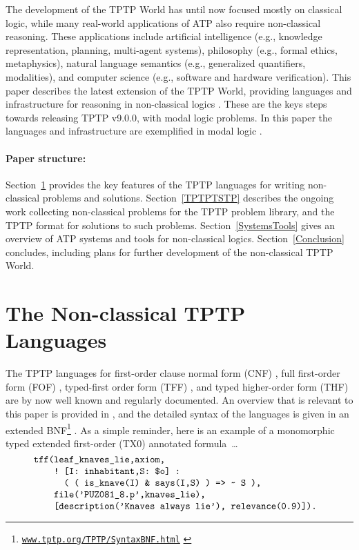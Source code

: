 \documentclass[runningheads]{llncs}
\begin{document}
The development of the TPTP World has until now focused mostly on classical logic, while many 
real-world applications of ATP also require non-classical reasoning. 
These applications include artificial intelligence (e.g., knowledge representation, planning, 
multi-agent systems), philosophy (e.g., formal ethics, metaphysics), natural language semantics 
(e.g., generalized quantifiers, modalities), and computer science (e.g., software and hardware 
verification).
This paper describes the latest extension of the TPTP World, providing languages and
infrastructure for reasoning in non-classical logics \cite{Pri08,Gob01}.
These are the keys steps towards releasing TPTP v9.0.0, with modal logic problems.
In this paper the languages and infrastructure are exemplified in modal logic \cite{BBW06}.

\paragraph{Paper structure:}
Section~\ref{TPTPLanguages} provides the key features of the TPTP languages for writing
non-classical problems and solutions. 
Section~\ref{TPTPTSTP} describes the ongoing work collecting non-classical problems for the TPTP
problem library, and the TPTP format for solutions to such problems.
Section~\ref{SystemsTools} gives an overview of ATP systems and tools for non-classical logics.
Section~\ref{Conclusion} concludes, including plans for further development of the non-classical
TPTP World.

\section{The Non-classical TPTP Languages}
\label{TPTPLanguages}

The TPTP languages for first-order clause normal form (CNF) \cite{SS98-JAR}, full first-order 
form (FOF) \cite{Sut09}, typed-first order form (TFF) \cite{SS+12,BP13-TFF1}, and typed 
higher-order form (THF) \cite{SB10,KSR16} are by now well known and regularly documented.
An overview that is relevant to this paper is provided in \cite{SF+22}, and the detailed
syntax of the languages is given in an extended BNF\footnote{%
\href{https://www.tptp.org/TPTP/SyntaxBNF.html}{\tt www.tptp.org/TPTP/SyntaxBNF.html}
\label{BNF}} \cite{VS06}.
As a simple reminder, here is an example of a monomorphic typed extended first-order (TX0) 
annotated formula~\ldots
\[
\begin{minipage}{\textwidth}
\begin{verbatim}
    tff(leaf_knaves_lie,axiom,
        ! [I: inhabitant,S: $o] : 
          ( ( is_knave(I) & says(I,S) ) => ~ S ),
        file('PUZ081_8.p',knaves_lie),
        [description('Knaves always lie'), relevance(0.9)]).
\end{verbatim}
\end{minipage}
\]
\end{document}
